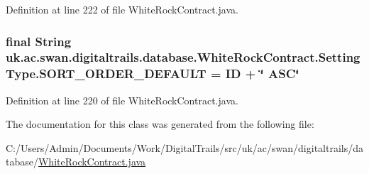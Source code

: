 Definition at line 222 of file White\+Rock\+Contract.\+java.

\hypertarget{classuk_1_1ac_1_1swan_1_1digitaltrails_1_1database_1_1_white_rock_contract_1_1_setting_type_ac9a5bda284d029af4ab32b609521b37f}{
\subsubsection[{S\+O\+R\+T\+\_\+\+O\+R\+D\+E\+R\+\_\+\+D\+E\+F\+A\+U\+L\+T}]{\setlength{\rightskip}{0pt plus 5cm}final String uk.\+ac.\+swan.\+digitaltrails.\+database.\+White\+Rock\+Contract.\+Setting\+Type.\+S\+O\+R\+T\+\_\+\+O\+R\+D\+E\+R\+\_\+\+D\+E\+F\+A\+U\+L\+T = I\+D + \char`\"{} A\+S\+C\char`\"{}\hspace{0.3cm}{\ttfamily [static]}}}\label{classuk_1_1ac_1_1swan_1_1digitaltrails_1_1database_1_1_white_rock_contract_1_1_setting_type_ac9a5bda284d029af4ab32b609521b37f}


Definition at line 220 of file White\+Rock\+Contract.\+java.



The documentation for this class was generated from the following file\+:\begin{DoxyCompactItemize}
\item 
C\+:/\+Users/\+Admin/\+Documents/\+Work/\+Digital\+Trails/src/uk/ac/swan/digitaltrails/database/\hyperlink{_white_rock_contract_8java}{White\+Rock\+Contract.\+java}\end{DoxyCompactItemize}

